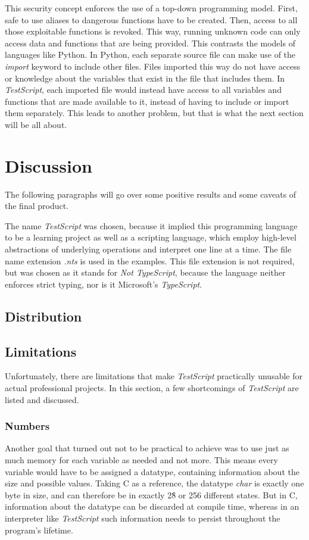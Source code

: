 \documentclass[12pt,a4paper]{article}
\newcommand{\name}{\emph{TestScript}}
\begin{document}
This security concept enforces the use of a top-down programming model. First, safe to use aliases
to dangerous functions have to be created. Then, access to all those exploitable functions is
revoked. This way, running unknown code can only access data and functions that are being provided.
This contrasts the models of languages like Python. In Python, each separate source file can
make use of the \emph{import} keyword to include other files. Files imported this way do not
have access or knowledge about the variables that exist in the file that includes them.
In \name{}, each imported file would instead have access to all variables and functions that
are made available to it, instead of having to include or import them separately.
This leads to another problem, but that is what the next section will be all about.


\section{Discussion}
The following paragraphs will go over some positive results and some caveats of the
final product.

The name \name{} was chosen, because it implied this programming language
to be a learning project as well as a scripting language, which employ
high-level abstractions of underlying operations and interpret one line
at a time. The file name extension \emph{.nts} is used in the examples. This
file extension is not required, but was chosen as it stands for \emph{Not TypeScript}, because
the language neither enforces strict typing, nor is it Microsoft's \emph{TypeScript}.

\subsection{Distribution}

\subsection{Limitations}\label{Limitations}
Unfortunately, there are limitations that make \name{} practically unusable for actual
professional projects. In this section, a few shortcomings of \name{} are listed
and discussed.

\subsubsection{Numbers}
Another goal that turned out not to be practical to achieve was to use just as much
memory for each variable as needed and not more. This means every variable would
have to be assigned a datatype, containing information about the size and possible values.
Taking C as a reference, the datatype \emph{char} is exactly one byte in size, and
can therefore be in exactly 2\^8 or 256 different states. But in C, information about
the datatype can be discarded at compile time, whereas in an interpreter like \name{} such
information needs to persist throughout the program's lifetime.
\end{document}
